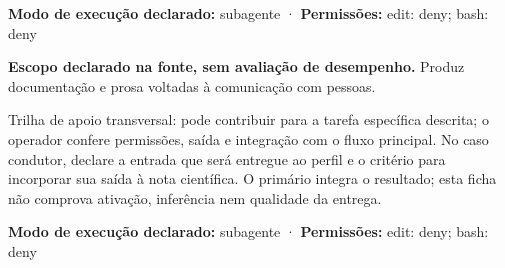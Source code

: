 \begin{arquitetura}
\textbf{Modo de execução declarado:} subagente · \textbf{Permissões:} edit: deny; bash: deny
\end{arquitetura}


\begin{descricao}
\textbf{Escopo declarado na fonte, sem avaliação de desempenho.}
Produz documentação e prosa voltadas à comunicação com pessoas.
\end{descricao}

\begin{funcao}
Trilha de apoio transversal: pode contribuir para a tarefa específica descrita; o operador confere permissões, saída e integração com o fluxo principal. No caso condutor, declare a entrada que será entregue ao perfil e o critério para incorporar sua saída à nota científica. O primário integra o resultado; esta ficha não comprova ativação, inferência nem qualidade da entrega.
\end{funcao}

\begin{arquitetura}
\textbf{Modo de execução declarado:} subagente · \textbf{Permissões:} edit: deny; bash: deny
\end{arquitetura}

